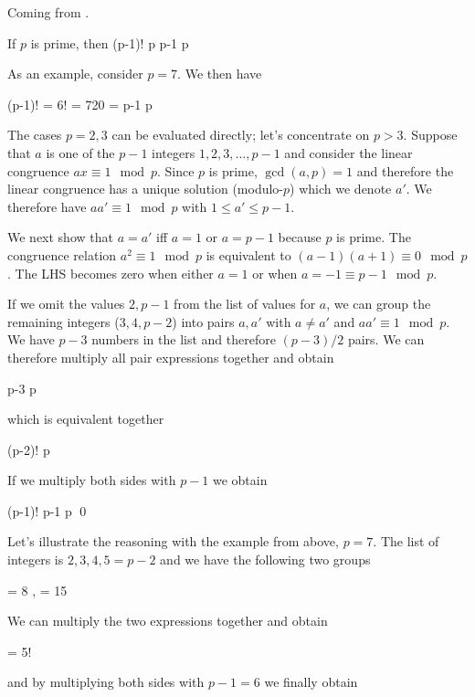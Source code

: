 
Coming from \cite{Burton2011}.

\begin{theorem}
    If $p$ is prime, then
    \bee
    (p-1)!  \mod p \equiv p-1 \mod p
    \eee
\end{theorem}

As an example, consider $p = 7$. We then have

\bee
(p-1)! = 6! = 720  = p-1 \mod p
\eee

The cases $p =2, 3$ can be evaluated directly; let's concentrate on $p > 3$. Suppose that $a$ is one of the $p-1$ integers $1,2,3,\ldots, p-1$ and consider the linear congruence $ax \equiv 1 \mod p$. Since $p$ is prime, $\gcd(a,p) = 1$ and therefore the linear congruence has a unique solution (modulo-$p$) which we denote $a'$. We therefore have $a a' \equiv 1 \mod p$ with $1 \leq a' \leq p-1$.

We next show that $a = a'$ iff $a = 1$ or $a = p-1$ because $p$ is prime. The congruence relation $a^2 \equiv 1 \mod p$ is equivalent to $(a-1)(a+1) \equiv 0 \mod p$. The LHS becomes zero when either $a = 1$ or when $a = -1 \equiv p-1 \mod p$.

If we omit the values $2, p-1$ from the list of values for $a$, we can group the remaining integers ($3,4, p-2$) into pairs $a, a'$ with $a \neq a'$ and $a a' \equiv 1 \mod p$. We have $p-3$ numbers in the list and therefore $(p-3)/2$ pairs. We can therefore multiply all pair expressions together and obtain

  \cdots p-3  \mod p
\eee

which is equivalent together

\bee
(p-2)!  \mod p
\eee

If we multiply both sides with $p-1$ we obtain

\bee
(p-1)! \equiv p-1  \mod p \qed
\eee

Let's illustrate the reasoning with the example from above, $p=7$. The list of integers is $2,3,4,5 = p-2$ and we have the following two groups

  = 8  ,   = 15  
\eee

We can multiply the two expressions together and obtain

    = 5!  
\eee

and by multiplying both sides with $p-1=6$ we finally obtain

